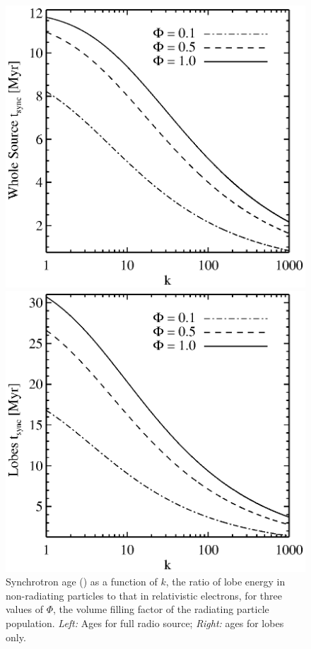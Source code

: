 \begin{figure}
  \begin{center}
    \begin{minipage}{0.495\linewidth}
      \includegraphics*[width=\textwidth, trim=30mm 5mm 35mm 10mm, clip]{tsyn_k.eps}
    \end{minipage}
    \begin{minipage}{0.495\linewidth}
      \includegraphics*[width=\textwidth, trim=30mm 5mm 35mm 10mm, clip]{tsyn_k_lobe.eps}
    \end{minipage}
    \caption{Synchrotron age (\tsync) as a function of $k$, the ratio
      of lobe energy in non-radiating particles to that in
      relativistic electrons, for three values of $\Phi$, the volume
      filling factor of the radiating particle
      population. {\it{Left:}} Ages for full radio source;
      {\it{Right:}} ages for lobes only.}
    \label{fig:tsync}
  \end{center}
\end{figure}

